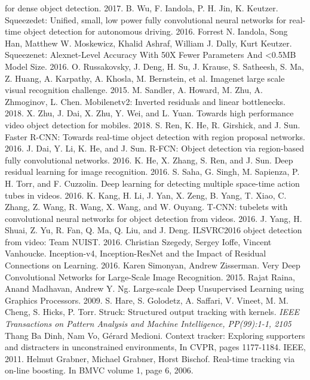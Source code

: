 \documentclass[conference]{IEEEtran}
\begin{document}
\begin{thebibliography}{00}
for dense object detection. 2017.
 B. Wu, F. Iandola, P. H. Jin, K. Keutzer. Squeezedet: Unified, small, low power fully convolutional neural networks for real-time object detection for autonomous driving. 2016.
 Forrest N. Iandola, Song Han, Matthew W. Moskewicz, Khalid Ashraf, William J. Dally, Kurt Keutzer. Squeezenet: Alexnet-Level Accuracy With 50X Fewer Parameters And <0.5MB Model Size. 2016.
 O. Russakovsky, J. Deng, H. Su, J. Krause, S. Satheesh, S. Ma, Z. Huang, A. Karpathy, A. Khosla, M. Bernstein, et al. Imagenet large scale visual recognition challenge. 2015.
 M. Sandler, A. Howard, M. Zhu, A. Zhmoginov, L. Chen. Mobilenetv2: Inverted residuals and linear bottlenecks. 2018.
 X. Zhu, J. Dai, X. Zhu, Y. Wei, and L. Yuan. Towards high performance video object detection for mobiles. 2018.
 S. Ren, K. He, R. Girshick, and J. Sun. Faster R-CNN: Towards real-time object detection with region proposal networks. 2016.
 J. Dai, Y. Li, K. He, and J. Sun. R-FCN: Object detection via region-based fully convolutional networks. 2016.
 K. He, X. Zhang, S. Ren, and J. Sun. Deep residual learning for image recognition. 2016.
 S. Saha, G. Singh, M. Sapienza, P. H. Torr, and F. Cuzzolin. Deep learning for detecting multiple space-time action tubes in videos. 2016.
 K. Kang, H. Li, J. Yan, X. Zeng, B. Yang, T. Xiao, C. Zhang, Z. Wang, R. Wang, X. Wang, and W. Ouyang. T-CNN: tubelets with convolutional neural networks for object detection from videos. 2016.
 J. Yang, H. Shuai, Z. Yu, R. Fan, Q. Ma, Q. Liu, and J. Deng. ILSVRC2016 object detection from video: Team NUIST. 2016.
 Christian Szegedy, Sergey Ioffe, Vincent Vanhoucke. Inception-v4, Inception-ResNet and the Impact of Residual Connections on Learning. 2016.
 Karen Simonyan, Andrew Zisserman. Very Deep Convolutional Networks for Large-Scale Image Recognition. 2015.
 Rajat Raina, Anand Madhavan, Andrew Y. Ng. Large-scale Deep Unsupervised Learning using Graphics Processors. 2009.
 S. Hare, S. Golodetz, A. Saffari, V. Vineet, M. M. Cheng, S. Hicks, P. Torr. Struck: Structured output tracking with kernels. \textit{IEEE Transactions on Pattern Analysis and Machine Intelligence, PP(99):1-1, 2105}
 Thang Ba Dinh, Nam Vo, Gérard Medioni. Context tracker: Exploring supporters and distracters in unconstrained environments, In CVPR, pages 1177-1184. IEEE, 2011.
 Helmut Grabner, Michael Grabner, Horst Bischof. Real-time tracking via on-line boosting. In BMVC volume 1, page 6, 2006.

\end{thebibliography}
\end{document}
